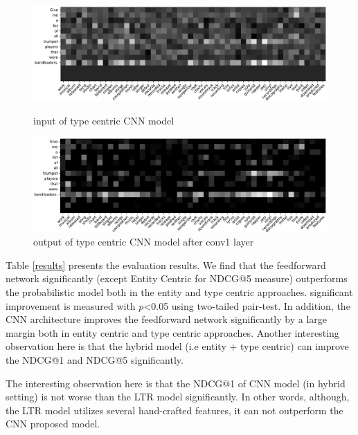 \begin{figure}
	\includegraphics[width=\textwidth]{leaders_in_cropped.pdf} \caption{input of type centric CNN model}\label{conv1Input}
	\includegraphics[width=\textwidth]{leaders_conv1_cropped.pdf}
	\caption{output of type centric CNN model after conv1 layer}\label{conv1Output}

\end{figure}



Table \ref{results} presents the evaluation results. We find that the feedforward network significantly (except Entity Centric for NDCG@5 measure) outperforms the probabilistic model both in the entity and type centric approaches. significant improvement is measured with $p$<0.05 using two-tailed pair-test. In addition, the CNN architecture improves the feedforward network significantly by a large margin both in entity centric and type centric approaches. Another interesting observation here is that the hybrid model (i.e entity + type centric) can improve the NDCG@1 and NDCG@5 significantly.

The interesting observation here is that the NDCG@1 of CNN model (in hybrid setting) is not worse than the LTR model significantly. In other words, although, the LTR model utilizes several hand-crafted features, it can not outperform the CNN proposed model.

